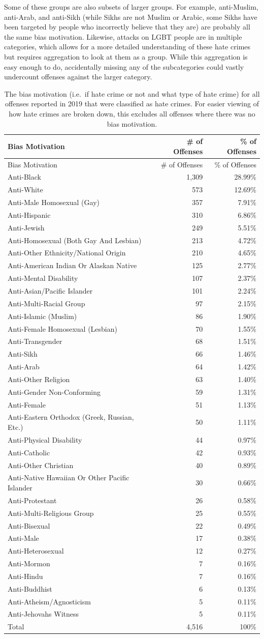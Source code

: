 \documentclass[
  12pt,
  openany]{book}
\begin{document}
Some of these groups are also subsets of larger groups. For example, anti-Muslim, anti-Arab, and anti-Sikh (while Sikhs are not Muslim or Arabic, some Sikhs have been targeted by people who incorrectly believe that they are) are probably all the same bias motivation. Likewise, attacks on LGBT people are in multiple categories, which allows for a more detailed understanding of these hate crimes but requires aggregation to look at them as a group. While this aggregation is easy enough to do, accidentally missing any of the subcategories could vastly undercount offenses against the larger category.

\begin{longtable}[]{@{}lrr@{}}
\caption{\label{tab:offenseBiasMotivationBiases}The bias motivation (i.e.~if hate crime or not and what type of hate crime) for all offenses reported in 2019 that were classified as hate crimes. For easier viewing of how hate crimes are broken down, this excludes all offenses where there was no bias motivation.}\tabularnewline
\toprule
Bias Motivation & \# of Offenses & \% of Offenses\tabularnewline
\midrule
\endfirsthead
\toprule
Bias Motivation & \# of Offenses & \% of Offenses\tabularnewline
\midrule
\endhead
Anti-Black & 1,309 & 28.99\%\tabularnewline
Anti-White & 573 & 12.69\%\tabularnewline
Anti-Male Homosexual (Gay) & 357 & 7.91\%\tabularnewline
Anti-Hispanic & 310 & 6.86\%\tabularnewline
Anti-Jewish & 249 & 5.51\%\tabularnewline
Anti-Homosexual (Both Gay And Lesbian) & 213 & 4.72\%\tabularnewline
Anti-Other Ethnicity/National Origin & 210 & 4.65\%\tabularnewline
Anti-American Indian Or Alaskan Native & 125 & 2.77\%\tabularnewline
Anti-Mental Disability & 107 & 2.37\%\tabularnewline
Anti-Asian/Pacific Islander & 101 & 2.24\%\tabularnewline
Anti-Multi-Racial Group & 97 & 2.15\%\tabularnewline
Anti-Islamic (Muslim) & 86 & 1.90\%\tabularnewline
Anti-Female Homosexual (Lesbian) & 70 & 1.55\%\tabularnewline
Anti-Transgender & 68 & 1.51\%\tabularnewline
Anti-Sikh & 66 & 1.46\%\tabularnewline
Anti-Arab & 64 & 1.42\%\tabularnewline
Anti-Other Religion & 63 & 1.40\%\tabularnewline
Anti-Gender Non-Conforming & 59 & 1.31\%\tabularnewline
Anti-Female & 51 & 1.13\%\tabularnewline
Anti-Eastern Orthodox (Greek, Russian, Etc.) & 50 & 1.11\%\tabularnewline
Anti-Physical Disability & 44 & 0.97\%\tabularnewline
Anti-Catholic & 42 & 0.93\%\tabularnewline
Anti-Other Christian & 40 & 0.89\%\tabularnewline
Anti-Native Hawaiian Or Other Pacific Islander & 30 & 0.66\%\tabularnewline
Anti-Protestant & 26 & 0.58\%\tabularnewline
Anti-Multi-Religious Group & 25 & 0.55\%\tabularnewline
Anti-Bisexual & 22 & 0.49\%\tabularnewline
Anti-Male & 17 & 0.38\%\tabularnewline
Anti-Heterosexual & 12 & 0.27\%\tabularnewline
Anti-Mormon & 7 & 0.16\%\tabularnewline
Anti-Hindu & 7 & 0.16\%\tabularnewline
Anti-Buddhist & 6 & 0.13\%\tabularnewline
Anti-Atheism/Agnosticism & 5 & 0.11\%\tabularnewline
Anti-Jehovahs Witness & 5 & 0.11\%\tabularnewline
Total & 4,516 & 100\%\tabularnewline
\bottomrule
\end{longtable}
\end{document}
